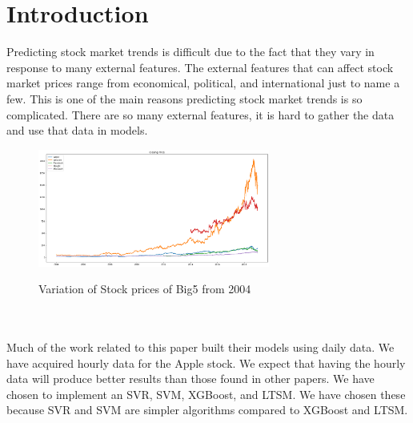 \usepackage{fancyhdr}\documentclass[conference]{IEEEtran}
\begin{document}
\section{Introduction}
Predicting stock market trends is difficult due to the fact that they vary in response to many external features. The external features that can affect stock market prices range from economical, political, and  international just to name a few. This is one of the main reasons predicting stock market trends is so complicated. There are so many external features, it is hard to gather the data and use that data in models. 
\begin{figure}[h]
    \centering
    {
        \includegraphics[width=3.0in]{all_data.png}
        \label{fig:first_sub}
    }
    \caption{Variation of Stock prices of Big5 from 2004}
    \label{fig:sample_subfigures}
\end{figure}
\\
\\

Much of the work related to this paper built their models using daily data. We have acquired hourly data for the Apple stock. We expect that having the hourly data will produce better results than those found in other papers. We have chosen to implement an SVR, SVM, XGBoost, and LTSM. We have chosen these because SVR and SVM are simpler algorithms compared to XGBoost and LTSM. 
\\
\end{document}
